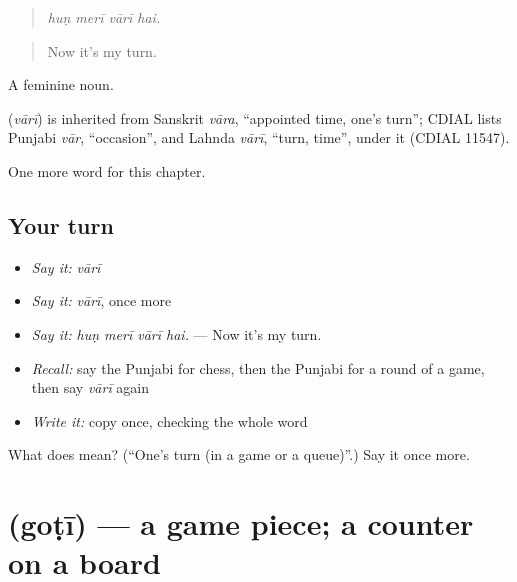 \begin{quote}
   
\end{quote}

\begin{quote}
\emph{huṇ merī vārī hai.}
\end{quote}

\begin{quote}
Now it's my turn.
\end{quote}

A feminine noun.

\begin{cousinweb}
\textbf{} (\emph{vārī}) is inherited from Sanskrit \emph{vāra}, \textquotedblleft{}appointed time, one's turn\textquotedblright{}; CDIAL lists Punjabi \emph{vār}, \textquotedblleft{}occasion\textquotedblright{}, and Lahnda \emph{vārī}, \textquotedblleft{}turn, time\textquotedblright{}, under it (CDIAL 11547).
\end{cousinweb}

\begin{grammarlens}[title={What you've built}]
One more word for this chapter.
\end{grammarlens}

\subsection*{Your turn}
\begin{itemize}
\raggedright
  \item \emph{Say it:} \emph{vārī}
  \item \emph{Say it:} \emph{vārī}, once more
  \item \emph{Say it:} \emph{huṇ merī vārī hai.} — Now it's my turn.
  \item \emph{Recall:} say the Punjabi for chess, then the Punjabi for a round of a game, then say \emph{vārī} again
  \item \emph{Write it:} copy \textbf{} once, checking the whole word
\end{itemize}

\begin{tcolorbox}[breakable,colback=teal!4,colframe=teal!35!black,title={Before you move on}]
What does  mean? (\textquotedblleft{}One's turn (in a game or a queue)\textquotedblright{}.) Say it once more.
\end{tcolorbox}
\section[\texorpdfstring{\pa{ਗੋਟੀ} (goṭī)}{ਗੋਟੀ (goṭī)}]{ (goṭī) — a game piece; a counter on a board}

